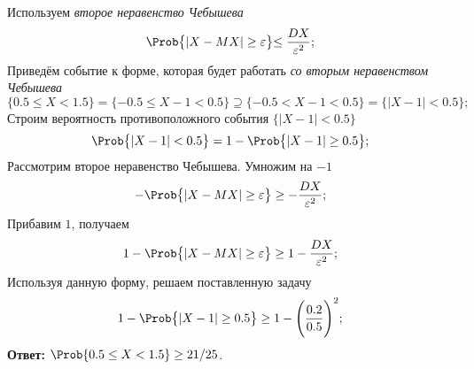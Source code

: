 \begin{slv}[$\{ 0.5 \leq X < 1.5 \}$]
	Используем \textit{второе неравенство Чебышева}
	\[
		\Prob\bigl\{ | X - MX | \geq \varepsilon \bigl\} \leq \frac{DX}{\varepsilon^2};
	\]
	Приведём событие к форме, которая будет работать \textit{со вторым неравенством Чебышева}
	\[
		\{ 0.5 \leq X < 1.5 \} = \{ -0.5 \leq X - 1 < 0.5 \} \supseteq \{ -0.5 < X - 1 < 0.5 \} = \bigl\{ |X - 1| < 0.5 \bigr\};
	\]
	Строим вероятность противоположного события $\bigl\{ |X - 1| < 0.5 \bigr\}$
	\[
		\Prob \bigl\{ |X - 1| < 0.5 \bigr\} = 1 - \Prob \bigl\{ |X - 1| \geq 0.5 \bigr\};
	\]
	Рассмотрим второе неравенство Чебышева. Умножим на $-1$
	\[
		- \Prob\bigl\{ | X - MX | \geq \varepsilon \bigr\} \geq - \frac{DX}{\varepsilon^2};
	\]
	Прибавим $1$, получаем
	\begin{equation}
		1 - \Prob\bigl\{ | X - MX | \geq \varepsilon \bigr\} \geq 1 - \frac{DX}{\varepsilon^2};
	\end{equation}
	Используя данную форму, решаем поставленную задачу
	\[
		1 - \Prob \bigl\{ |X - 1| \geq 0.5 \bigr\} \geq 1 - \Biggl(\frac{0.2}{0.5}\Biggr)^2;
	\]
	\textbf{Ответ:} $\Prob \{ 0.5 \leq X < 1.5 \} \geq 21/25$.
\end{slv}

